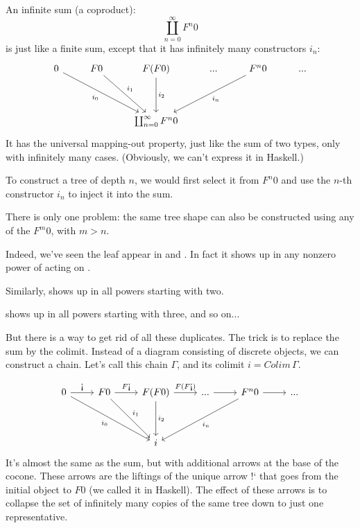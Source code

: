 \documentclass[DaoFP]{subfiles}
\begin{document}
An infinite sum (a coproduct):
$$ \coprod_{n = 0}^{\infty} F^n 0$$
is just like a finite sum, except that it has infinitely many constructors $i_n$:
\[
 \begin{tikzcd}
 0
 \arrow[ddrr, "i_0"']
 & F 0
  \arrow[ddr, "i_1"]
& F (F 0)
  \arrow[dd, "i_2"]
 & ...
 & F^n 0
  \arrow[ddll, "i_n"]
 & ...
 \\
 \\
 &&\coprod_{n = 0}^{\infty} F^n 0
  \end{tikzcd}
\]
It has the universal mapping-out property, just like the sum of two types, only with infinitely many cases. (Obviously, we can't express it in Haskell.)

To construct a tree of depth $n$, we would first select it from $F^n 0$ and use the $n$-th constructor $i_n$ to inject it into the sum. 

There is only one problem: the same tree shape can also be constructed using any of the $F^m 0$, with $m > n$. 

Indeed, we've seen the leaf  appear in  and . In fact it shows up in any nonzero power of  acting on . 

Similarly,  shows up in all powers starting with two.

 shows up in all powers starting with three, and so on...

But there is a way to get rid of all these duplicates. The trick is to replace the sum by the colimit. Instead of a diagram consisting of discrete objects, we can construct a chain. Let's call this chain $\Gamma$, and its colimit $i = Colim \, \Gamma$.

\[
 \begin{tikzcd}
 0
 \arrow[r, "\mbox{!`}"]
 \arrow[ddrr, "i_0"']
 & F 0
  \arrow[r, "F\mbox{!`}"]
 \arrow[ddr, "i_1"]
& F (F 0)
  \arrow[r, "F(F\mbox{!`})"]
  \arrow[dd, "i_2"]
 & ...
 \arrow[r]
 & F^n 0
  \arrow[r]
 \arrow[ddll, "i_n"]
 & ...
 \\
 \\
 &&i
  \end{tikzcd}
\]
It's almost the same as the sum, but with additional arrows at the base of the cocone. These arrows are the liftings of the unique arrow $\mbox{!`}$ that goes from the initial object to $F 0$ (we called it  in Haskell). The effect of these arrows is to collapse the set of infinitely many copies of the same tree down to just one representative. 
\end{document}
